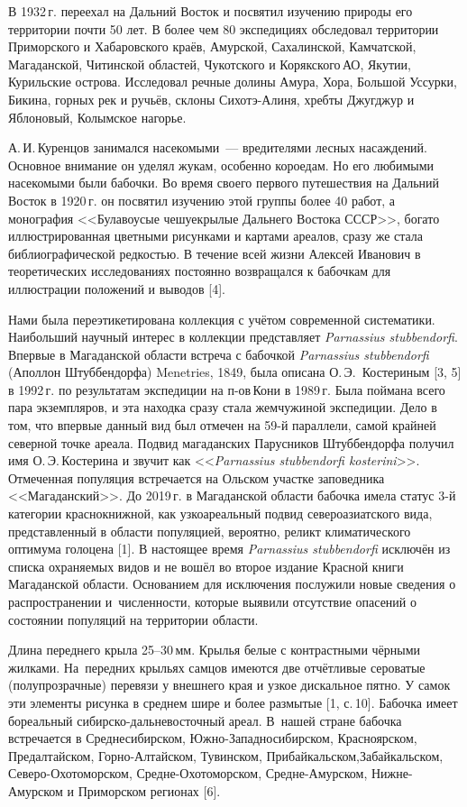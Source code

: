 В 1932\,г. переехал на Дальний Восток и посвятил изучению природы его территории почти 50 лет. В более чем 80 экспедициях обследовал территории Приморского и Хабаровского краёв, Амурской, Сахалинской, Камчатской, Магаданской, Читинской областей, Чукотского и Корякского\,АО, Якутии, Курильские острова. Исследовал речные долины Амура, Хора, Большой Уссурки, Бикина, горных рек и ручьёв, склоны Сихотэ-Алиня, хребты Джугджур и Яблоновый, Колымское нагорье.

А.\,И.\,Куренцов занимался насекомыми~--- вредителями лесных насаждений. Основное внимание он уделял жукам, особенно короедам. Но его любимыми насекомыми были бабочки. Во время своего первого путешествия на Дальний Восток в 1920\,г. он посвятил изучению этой группы более 40 работ, а монография <<Булавоусые чешуекрылые Дальнего Востока СССР>>, богато иллюстрированная цветными рисунками и картами ареалов, сразу же стала библиографической редкостью. В течение всей жизни Алексей Иванович в теоретических исследованиях постоянно возвращался к бабочкам для иллюстрации положений и выводов [4].


Нами была переэтикетирована коллекция с учётом современной систематики. Наибольший научный интерес в коллекции представляет \textit{Parnassius stubbendorfi}. Впервые в Магаданской области встреча с бабочкой \textit{Parnassius stubbendorfi} (Аполлон Штуббендорфа) Menetries, 1849, была описана О.\,Э.~Костериным [3, 5] в 1992\,г. по результатам экспедиции на п-ов\,Кони в 1989\,г. Была поймана всего пара экземпляров, и эта находка сразу стала жемчужиной экспедиции. Дело в том, что впервые данный вид был отмечен на 59-й параллели, самой крайней северной точке ареала. Подвид магаданских Парусников Штуббендорфа получил имя О.\,Э.\,Костерина и звучит как <<\textit{Parnassius stubbendorfi kosterini}>>. Отмеченная популяция встречается на Ольском участке заповедника <<Магаданский>>. До 2019\,г. в Магаданской области бабочка имела статус 3-й\,категории краснокнижной, как узкоареальный подвид североазиатского вида, представленный в области популяцией, вероятно, реликт климатического оптимума голоцена [1]. В настоящее время \textit{Parnassius stubbendorfi} исключён из списка охраняемых видов и не вошёл во второе издание Красной книги Магаданской области. Основанием для исключения послужили новые сведения о распространении и~численности, которые выявили отсутствие опасений о состоянии популяций на территории области.

Длина переднего крыла 25--30\,мм. Крылья белые с контрастными чёрными жилками. На~передних крыльях самцов имеются две отчётливые сероватые (полупрозрачные) перевязи у внешнего края и узкое дискальное пятно. У самок эти элементы рисунка в среднем шире и более размытые [1, с.\,10]. Бабочка имеет бореальный сибирско-дальневосточный ареал. В~нашей стране бабочка встречается в Среднесибирском, Южно-Западносибирском, Красноярском, Предалтайском, Горно-Алтайском, Тувинском, Прибайкальском,\;\;Забайкальском, Северо-Охо\-то\-морс\-ком, Средне-Охотоморском, Средне-Амурском, Нижне-Амурском и Приморском регионах [6].

